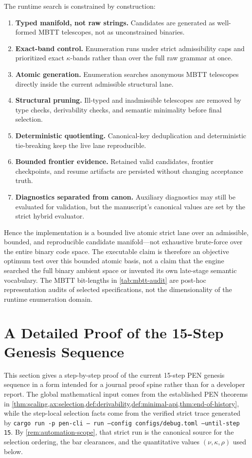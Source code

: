 \documentclass[11pt,a4paper]{article}
\theoremstyle{plain}
\theoremstyle{definition}
\theoremstyle{remark}
\begin{document}
The runtime search is constrained by construction:
\begin{enumerate}[nosep]
    \item \textbf{Typed manifold, not raw strings.} Candidates are generated as well-formed MBTT telescopes, not as unconstrained binaries.
    \item \textbf{Exact-band control.} Enumeration runs under strict admissibility caps and prioritized exact $\kappa$-bands rather than over the full raw grammar at once.
    \item \textbf{Atomic generation.} Enumeration searches anonymous MBTT telescopes directly inside the current admissible structural lane.
    \item \textbf{Structural pruning.} Ill-typed and inadmissible telescopes are removed by type checks, derivability checks, and semantic minimality before final selection.
    \item \textbf{Deterministic quotienting.} Canonical-key deduplication and deterministic tie-breaking keep the live lane reproducible.
    \item \textbf{Bounded frontier evidence.} Retained valid candidates, frontier checkpoints, and resume artifacts are persisted without changing acceptance truth.
    \item \textbf{Diagnostics separated from canon.} Auxiliary diagnostics may still be evaluated for validation, but the manuscript's canonical values are set by the strict hybrid evaluator.
\end{enumerate}

Hence the implementation is a bounded live atomic strict lane over an admissible, bounded, and reproducible candidate manifold---not exhaustive brute-force over the entire binary code space.
The executable claim is therefore an objective optimum test over this bounded atomic basis, not a claim that the engine searched the full binary ambient space or invented its own late-stage semantic vocabulary.
The MBTT bit-lengths in \cref{tab:mbtt-audit} are post-hoc representation audits of selected specifications, not the dimensionality of the runtime enumeration domain.

\section{A Detailed Proof of the 15-Step Genesis Sequence}
\label{sec:genesis-sequence-proof}

This section gives a step-by-step proof of the current 15-step PEN genesis
sequence in a form intended for a journal proof spine rather than for a
developer report.
The global mathematical input comes from the established PEN theorems in
\cref{thm:scaling,ax:selection,def:derivability,def:minimal-api,thm:end-of-history},
while the step-local selection facts come from the verified strict trace
generated by
\texttt{cargo run -p pen-cli -- run --config configs/debug.toml --until-step 15}.
By \cref{rem:automation-scope}, that strict run is the canonical source for the
selection ordering, the bar clearances, and the quantitative values
$(\nu,\kappa,\rho)$ used below.
\end{document}
